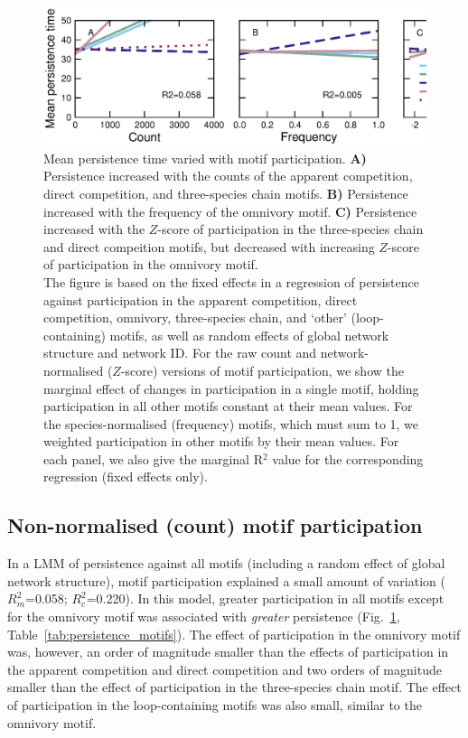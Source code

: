 \documentclass[12pt]{article}
\begin{document}
\begin{spacing}{2.0}
    \begin{figure}[ht!]
        \centering
        \includegraphics[width=\textwidth]{figures/roles/persistence_vs_motifs.eps}
        \caption{Mean persistence time varied with motif participation. \textbf{A)} Persistence increased with the counts of the apparent competition, direct competition, and three-species chain motifs. \textbf{B)} Persistence increased with the frequency of the omnivory motif. \textbf{C)} Persistence increased with the $Z$-score of participation in the three-species chain and direct compeition motifs, but decreased with increasing $Z$-score of participation in the omnivory motif. \\The figure is based on the fixed effects in a regression of persistence against participation in the apparent competition, direct competition, omnivory, three-species chain, and `other' (loop-containing) motifs, as well as random effects of global network structure and network ID. For the raw count and network-normalised ($Z$-score) versions of motif participation, we show the marginal effect of changes in participation in a single motif, holding participation in all other motifs constant at their mean values. For the species-normalised (frequency) motifs, which must sum to 1, we weighted participation in other motifs by their mean values. For each panel, we also give the marginal R$^2$ value for the corresponding regression (fixed effects only).}
        \label{fig:persistence_motifs}
	    \end{figure}

	
	\subsection*{Non-normalised (count) motif participation}

		In a LMM of persistence against all motifs (including a random effect of global network structure), motif participation explained a small amount of variation ($R^{2}_m$=0.058; $R^2_c$=0.220).
		In this model, greater participation in all motifs except for the omnivory motif was associated with \emph{greater} persistence (Fig.~\ref{fig:persistence_motifs}, Table~\ref{tab:persistence_motifs}).
		The effect of participation in the omnivory motif was, however, an order of magnitude smaller than the effects of participation in the apparent competition and direct competition and two orders of magnitude smaller than the effect of participation in the three-species chain motif.
		The effect of participation in the loop-containing motifs was also small, similar to the omnivory motif.



\end{spacing}
\end{document}
